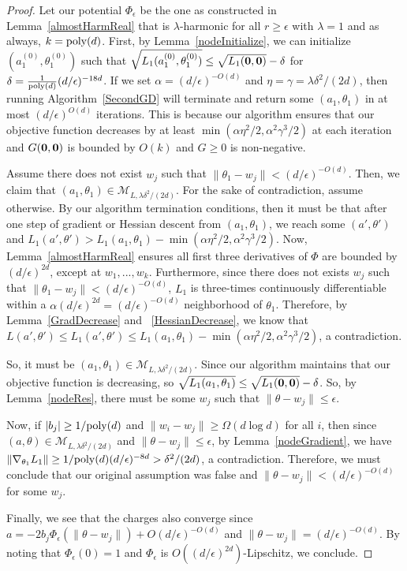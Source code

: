 \begin{proof}
Let our potential $\Phi_{\epsilon}$ be the one as constructed in Lemma~\ref{almostHarmReal} that is $\lambda$-harmonic for all $r \geq \epsilon$ with $\lambda = 1$ and as always, $k = \mathrm{poly}(d)$. First, by Lemma~\ref{nodeInitialize},  we can initialize ${(a_1^{(0)},\theta_1^{(0)})}$ such that $\sqrt{L_1({a_1^{(0)},\theta_1^{(0)}})} \leq \sqrt{ L_1({\bf 0,0})} - \delta$ for $ \delta = \frac{1}{\mathrm{poly}(d)}(d/\epsilon)^{ -18d}$. If we set $\alpha = (d/\epsilon)^{-O(d)}$ and $\eta = \gamma = \lambda \delta^2/(2d)$,  then running Algorithm~\ref{SecondGD} will terminate and return some $(a_1,\theta_1)$ in at most $(d/\epsilon)^{O(d)}$ iterations. This is because our algorithm ensures that our objective function decreases by at least $\min(\alpha \eta^2/2, \alpha^2\gamma^3/2)$ at each iteration and $G({\bf 0, 0})$ is bounded by $O(k)$ and $G \geq 0$ is non-negative.

Assume there does not exist $w_j$ such that $\|\theta_1 - w_j\| < (d/\epsilon)^{-O(d)}$. Then, we claim that $(a_1,\theta_1) \in \mathcal{M}_{L,\lambda \delta^2/(2d)}$. For the sake of contradiction, assume otherwise. By our algorithm termination conditions, then it must be that after one step of gradient or Hessian descent from $(a_1,\theta_1)$, we reach some $(a',\theta')$ and $L_1(a',\theta') > L_1(a_1,\theta_1) - \min(\alpha\eta^2/2,\alpha^2\gamma^3/2)$. Now, Lemma~\ref{almostHarmReal} ensures all first three derivatives of $\Phi$ are bounded by $(d/\epsilon)^{2d}$, except at $w_1,...,w_k$. Furthermore, since there does not exists $w_j$ such that $\|\theta_1 - w_j\| < (d/\epsilon)^{-O(d)}$, $L_1$ is three-times continuously differentiable within a $\alpha (d/\epsilon)^{2d} = (d/\epsilon)^{-O(d)}$ neighborhood of $ \theta_1$. Therefore, by Lemma~\ref{GradDecrease} and ~\ref{HessianDecrease}, we know that $L(a',\theta') \leq L_1(a',\theta') \leq L_1(a_1,\theta_1) - \min(\alpha\eta^2/2,\alpha^2\gamma^3/2)$, a contradiction. 

So, it must be $(a_1,\theta_1) \in \mathcal{M}_{L,\lambda \delta^2/(2d)}$. Since our algorithm maintains that our objective function is decreasing, so $\sqrt{L_1({a_1,\theta_1})} \leq \sqrt{L_1({\bf 0,0})} - \delta $. So, by Lemma~\ref{nodeRes}, there must be some $w_j$ such that $\|\theta- w_j\|\leq \epsilon$.

Now, if $|b_j| \geq 1/\mathrm{poly}(d)$ and $\|w_i - w_j\| \geq \Omega(d\log d)$ for all $i$, then since $(a,\theta) \in \mathcal{M}_{L,\lambda \delta^2/(2d)}$ and $\|\theta - w_j \| \leq \epsilon$, by Lemma~\ref{nodeGradient}, we have $\|\nabla_{\theta_1}L_1 \| \geq 1/\mathrm{poly}(d)(d/\epsilon)^{-8d} > \delta^2/(2d)$, a contradiction. Therefore, we must conclude that our original assumption was false and $\|\theta - w_j\| < (d/\epsilon)^{-O(d)}$ for some $w_j$.

Finally, we see that the charges also converge since $a = -2b_j \Phi_\epsilon(\|\theta - w_j\|) + O(d/\epsilon)^{-O(d)}$ and $\|\theta - w_j\| = (d/\epsilon)^{-O(d)}$. By noting that $\Phi_\epsilon(0) = 1$ and $\Phi_\epsilon$ is $O((d/\epsilon)^{2d})$-Lipschitz, we conclude. 
\end{proof}


